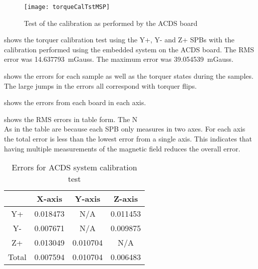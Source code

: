 \begin{figure}[!ht]
    \centering
    \texttt{[image: torqueCalTstMSP]}
    \caption{Test of the calibration as performed by the \ac{ACDS} board}
    \label{fig:tcalMSP}
\end{figure}

 shows the torquer calibration test using the Y+, Y- and Z+ \acp{SPB} with the calibration performed using the embedded system on the \ac{ACDS} board. The RMS error was 14.637793~mGauss. The maximum error was 39.054539~mGauss.


 shows the errors for each sample as well as the torquer states during the samples. The large jumps in the errors all correspond with torquer flips.


 shows the errors from each board in each axis.

 shows the RMS errors in table form. The N\\As in the table are because each \ac{SPB} only measures in two axes. For each axis the total error is less than the lowest error from a single axis. This indicates that having multiple measurements of the magnetic field reduces the overall error.

\begin{table}[!ht]
    \centering
    \caption{Errors for \ac{ACDS} system calibration test}
    \label{tab:tcalMSPerr}
    \begin{tabular}{|c|c|c|c|}
        \hline
        &X-axis&Y-axis&Z-axis\\
        \hline
        Y+&0.018473&N/A&0.011453\\
        \hline
        Y-&0.007671&N/A&0.009875\\
        \hline
        Z+&0.013049&0.010704&N/A\\
        \hline
        Total&0.007594&0.010704&0.006483\\
        \hline
    \end{tabular}
\end{table}

